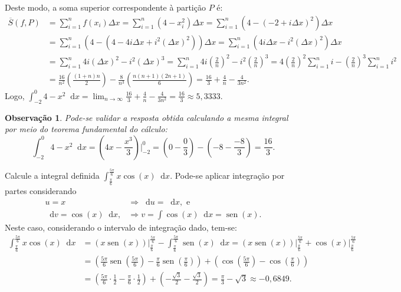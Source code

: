 \documentclass[12pt,a4paper]{article}
\newtheorem*{note}{Observação}
\newcommand*\diff{\mathop{}\!\mathrm{d}}
\newcommand*\sen{\operatorname{sen}}
\begin{document}
\begin{ExerciseList}
Deste modo, a soma superior correspondente à partição $P$ é:
\begin{align*}
  \overline{S}(f, P)
  & = \sum_{i=1}^n f(x_i) \Delta x
    = \sum_{i=1}^n \left(4-x_i^2\right) \Delta x
    = \sum_{i=1}^n \left(4-(-2 + i\Delta x)^2\right) \Delta x \\
  & = \sum_{i=1}^n \left(4-(4 - 4i\Delta x + i^2(\Delta x) ^2)\right) \Delta x
    = \sum_{i=1}^n \left(4i\Delta x - i^2(\Delta x) ^2\right) \Delta x \\
  & = \sum_{i=1}^n 4i(\Delta x)^2 - i^2(\Delta x)^3
    = \sum_{i=1}^n 4i\left(\frac{2}{n}\right)^2 - i^2\left(\frac{2}{n}\right)^3
    = 4 \left(\frac{2}{n}\right)^2 \sum_{i=1}^n i - \left(\frac{2}{n}\right)^3\sum_{i=1}^n i^2 \\
  & = \frac{16}{n^2} \left(\frac{(1+n)n}{2}\right) - \frac{8}{n^3}\left(\frac{n(n+1)(2n+1)}{6}\right)
    = \frac{16}{3} + \frac{4}{n} - \frac{4}{3n^2}.
\end{align*}
Logo, $\int_{-2}^0 4-x^2\diff{x} = \lim_{n \to \infty} \frac{16}{3} + \frac{4}{n} - \frac{4}{3n^2} = \frac{16}{3} \approx 5,3333$.

\begin{note}
  Pode-se validar a resposta obtida calculando a mesma integral por meio do teorema fundamental do cálculo:
  \[
    \int_{-2}^0 4-x^2\diff{x}
    = \left(4x-\frac{x^3}{3}\right)\bigg\rvert_{-2}^0
    = \left(0-\frac{0}{3}\right) - \left(-8-\frac{-8}{3}\right)
    = \frac{16}{3}.
  \]
\end{note}


\Exercise[title={2,0}]
Calcule a integral definida $\int_{\frac{\pi}{6}}^{\frac{5\pi}{6}} x\cos(x) \diff{x}$.
\Answer Pode-se aplicar integração por partes considerando
\begin{align*}
  u=x
  & \Rightarrow \diff{u} = \diff{x}, \text{ e} \\
  \diff{v} = \cos(x) \diff{x},
  & \Rightarrow v = \int \cos(x) \diff{x} = \sen(x).
\end{align*}
Neste caso, considerando o intervalo de integração dado, tem-se:
\begin{align*}
  \int_{\frac{\pi}{6}}^{\frac{5\pi}{6}} x\cos(x) \diff{x}
  & = \left(x \sen(x) \right)\bigg\rvert_{\frac{\pi}{6}}^{\frac{5\pi}{6}}
    - \int_{\frac{\pi}{6}}^{\frac{5\pi}{6}} \sen(x) \diff{x}
    = \left(x \sen(x) \right)\bigg\rvert_{\frac{\pi}{6}}^{\frac{5\pi}{6}}
    + \cos(x) \bigg\rvert_{\frac{\pi}{6}}^{\frac{5\pi}{6}} \\
  & = \left(\frac{5\pi}{6}\sen\left(\frac{5\pi}{6}\right) - \frac{\pi}{6}\sen\left(\frac{\pi}{6}\right)\right) + \left(\cos\left(\frac{5\pi}{6}\right)-\cos\left(\frac{\pi}{6}\right)\right) \\
  & = \left(\frac{5\pi}{6}\cdot \frac{1}{2} - \frac{\pi}{6}\cdot \frac{1}{2}\right) + \left(-\frac{\sqrt{3}}{2}-\frac{\sqrt{3}}{2}\right)
    = \frac{\pi}{3} - \sqrt{3}
    \approx -0,6849.
\end{align*}


\end{ExerciseList}
\end{document}
